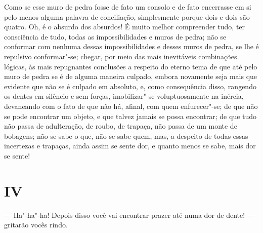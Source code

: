 Como se esse muro de pedra fosse de fato um consolo e de fato encerrasse
em si pelo menos alguma palavra de conciliação, simplesmente porque
dois e dois são quatro. Oh, é o absurdo dos absurdos! É muito melhor
compreender tudo, ter consciência de tudo, todas as impossibilidades e
muros de pedra; não se conformar com nenhuma dessas impossibilidades e
desses muros de pedra, se lhe é repulsivo conformar"-se; chegar, por
meio das mais inevitáveis combinações lógicas, às mais repugnantes
conclusões a respeito do eterno tema de que até pelo muro de pedra se é
de alguma maneira culpado, embora novamente seja mais que evidente que
não se é culpado em absoluto, e, como consequência disso, rangendo os
dentes em silêncio e sem forças, imobilizar"-se voluptuosamente na
inércia, devaneando com o fato de que não há, afinal, com quem
enfurecer"-se; de que não se pode encontrar um objeto, e que talvez
jamais se possa encontrar; de que tudo não passa de adulteração, de
roubo, de trapaça, não passa de um monte de bobagens; não se sabe o
que, não se sabe quem, mas, a despeito de todas essas incertezas e
trapaças, ainda assim se sente dor, e quanto menos se sabe, mais dor se
sente!


\section{IV}

--- Ha"-ha"-ha! Depois disso você vai encontrar prazer até numa dor de
dente! --- gritarão vocês rindo.

